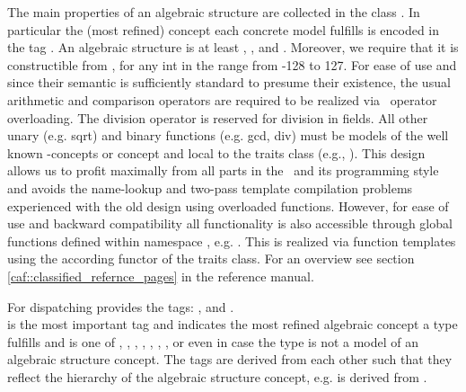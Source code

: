 The main properties of an algebraic structure are collected in the class   
. 
In particular the (most refined) concept each concrete model  
fulfills is encoded in the tag 
.
An algebraic structure is at least , 
,  and 
. Moreover, we require that it is
constructible from , for any int in the range from -128 to 127. 
For ease of use and since their semantic is sufficiently standard to presume 
their existence, the usual arithmetic and comparison operators are required
to be realized via \CC\ operator overloading. 
The division operator is reserved for division in fields.  
All other unary (e.g. sqrt) and binary functions 
(e.g. gcd, div) must be models of the well known \stl-concepts
 or 
concept and local to the traits class 
(e.g., ). 
This design allows us to profit maximally from all parts in the 
\stl\ and its programming style and avoids the name-lookup and 
two-pass template compilation problems experienced with the old design 
using overloaded functions. However, for ease of use and backward 
compatibility all functionality is also 
accessible through global functions defined within namespace , 
e.g. . This is realized via function templates using 
the according functor of the traits class. For an overview see section  
\ref{caf::classified_refernce_pages} in the reference manual.

For dispatching  provides the tags:  
,  and . \\ 
 is the most important tag and indicates the most refined 
algebraic concept a type fulfills and is one of 
, , ,
, , ,
,  or even  
in case the type is not a model of an algebraic structure concept. The tags are derived 
from each other such that they reflect the hierarchy of the algebraic 
structure concept,  e.g.  is derived from . \\

